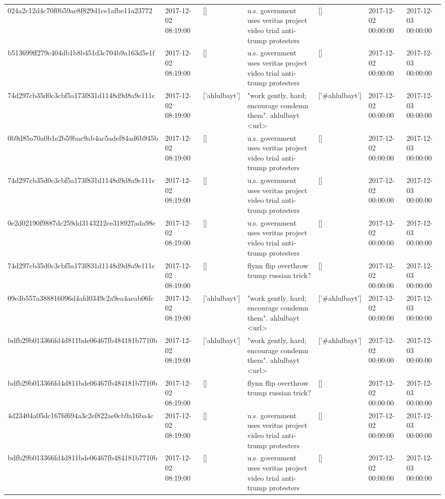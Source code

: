 \begin{tabular}{lllllll}
024a2c12d4c70f0b59ae8f829d1ce1afbe11a23772 & 2017-12-02 08:19:00 & [] & u.s. government uses veritas project video trial anti-trump protesters & [] & 2017-12-02 00:00:00 & 2017-12-03 00:00:00 \\
b513699ff279c404db1b8b451d3c704b9a163d5e1f & 2017-12-02 08:19:00 & [] & u.s. government uses veritas project video trial anti-trump protesters & [] & 2017-12-02 00:00:00 & 2017-12-03 00:00:00 \\
74d297cb35d0c3cbf5a173f831d1148d9d8a9e111c & 2017-12-02 08:19:00 & ['ahlulbayt'] & "work gently, hard; encourage condemn them". ahlulbayt <url> & ['#ahlulbayt'] & 2017-12-02 00:00:00 & 2017-12-03 00:00:00 \\
0b9d85a70a0b1e2b59bac9ab4ac5adef84ad6b945b & 2017-12-02 08:19:00 & [] & u.s. government uses veritas project video trial anti-trump protesters & [] & 2017-12-02 00:00:00 & 2017-12-03 00:00:00 \\
74d297cb35d0c3cbf5a173f831d1148d9d8a9e111c & 2017-12-02 08:19:00 & [] & u.s. government uses veritas project video trial anti-trump protesters & [] & 2017-12-02 00:00:00 & 2017-12-03 00:00:00 \\
0e2d02190f9887dc259dd3143212ce318927ada98c & 2017-12-02 08:19:00 & [] & u.s. government uses veritas project video trial anti-trump protesters & [] & 2017-12-02 00:00:00 & 2017-12-03 00:00:00 \\
74d297cb35d0c3cbf5a173f831d1148d9d8a9e111c & 2017-12-02 08:19:00 & [] & flynn flip overthrow trump russian trick? & [] & 2017-12-02 00:00:00 & 2017-12-03 00:00:00 \\
09e3b557a388816096d4afd0349c2a9ea4aeab06fc & 2017-12-02 08:19:00 & ['ahlulbayt'] & "work gently, hard; encourage condemn them". ahlulbayt <url> & ['#ahlulbayt'] & 2017-12-02 00:00:00 & 2017-12-03 00:00:00 \\
bdfb29b013366fd4d811bde06467fb484181b7710b & 2017-12-02 08:19:00 & ['ahlulbayt'] & "work gently, hard; encourage condemn them". ahlulbayt <url> & ['#ahlulbayt'] & 2017-12-02 00:00:00 & 2017-12-03 00:00:00 \\
bdfb29b013366fd4d811bde06467fb484181b7710b & 2017-12-02 08:19:00 & [] & flynn flip overthrow trump russian trick? & [] & 2017-12-02 00:00:00 & 2017-12-03 00:00:00 \\
4d23404a05dc1676f694a3c2ef822ae0cb9a16ba4c & 2017-12-02 08:19:00 & [] & u.s. government uses veritas project video trial anti-trump protesters & [] & 2017-12-02 00:00:00 & 2017-12-03 00:00:00 \\
bdfb29b013366fd4d811bde06467fb484181b7710b & 2017-12-02 08:19:00 & [] & u.s. government uses veritas project video trial anti-trump protesters & [] & 2017-12-02 00:00:00 & 2017-12-03 00:00:00 \\

\end{tabular}
